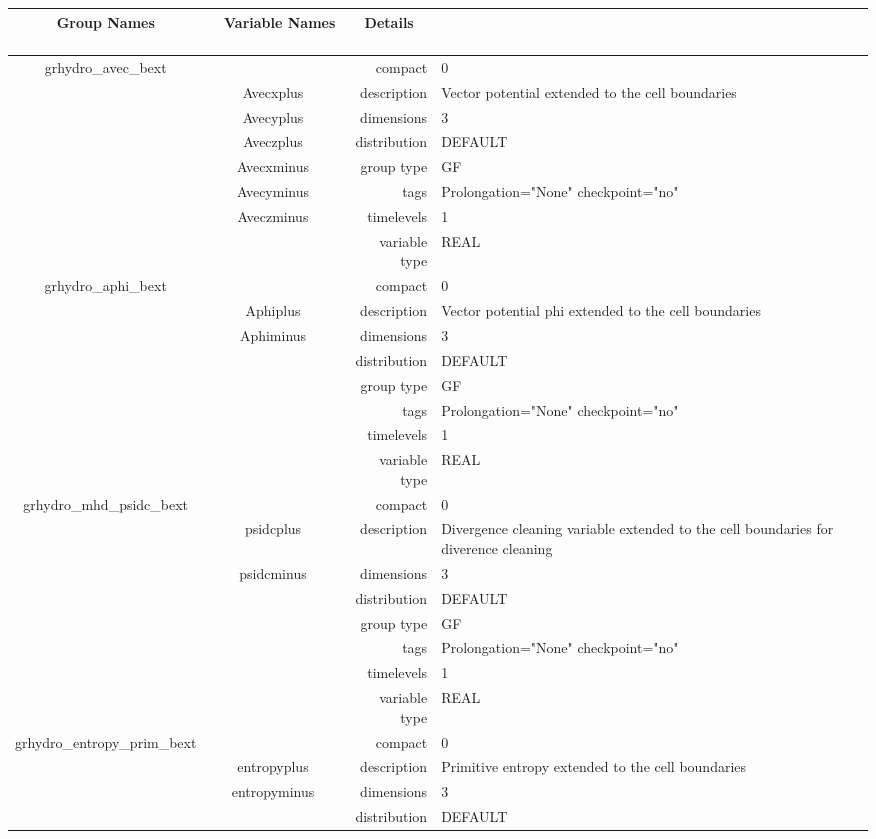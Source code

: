 \begin{tabular*}{150mm}{|c|c@{\extracolsep{\fill}}|rl|} \hline 
~ {\bf Group Names} ~ & ~ {\bf Variable Names} ~  &{\bf Details} ~ & ~ \\ 
\hline 
grhydro\_avec\_bext &  & compact & 0 \\ 
 & Avecxplus & description & Vector potential extended to the cell boundaries \\ 
 & Avecyplus & dimensions & 3 \\ 
 & Aveczplus & distribution & DEFAULT \\ 
 & Avecxminus & group type & GF \\ 
 & Avecyminus & tags & Prolongation="None" checkpoint="no" \\ 
 & Aveczminus & timelevels & 1 \\ 
 &  & variable type & REAL \\ 
\hline 
grhydro\_aphi\_bext &  & compact & 0 \\ 
 & Aphiplus & description & Vector potential phi extended to the cell boundaries \\ 
 & Aphiminus & dimensions & 3 \\ 
 &  & distribution & DEFAULT \\ 
 &  & group type & GF \\ 
 &  & tags & Prolongation="None" checkpoint="no" \\ 
 &  & timelevels & 1 \\ 
 &  & variable type & REAL \\ 
\hline 
grhydro\_mhd\_psidc\_bext &  & compact & 0 \\ 
 & psidcplus & description & Divergence cleaning variable extended to the cell boundaries for diverence cleaning \\ 
 & psidcminus & dimensions & 3 \\ 
 &  & distribution & DEFAULT \\ 
 &  & group type & GF \\ 
 &  & tags & Prolongation="None" checkpoint="no" \\ 
 &  & timelevels & 1 \\ 
 &  & variable type & REAL \\ 
\hline 
grhydro\_entropy\_prim\_bext &  & compact & 0 \\ 
 & entropyplus & description & Primitive entropy extended to the cell boundaries \\ 
 & entropyminus & dimensions & 3 \\ 
 &  & distribution & DEFAULT \\ 

\end{tabular*}
